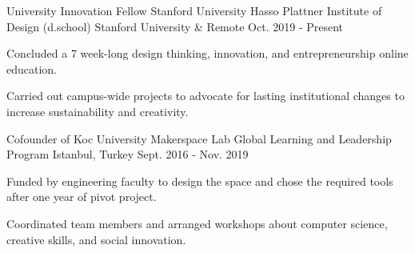 \begin{cventries}
  \cvopenentry
    {University Innovation Fellow} %
    {Stanford University Hasso Plattner Institute of Design (d.school) } %
    {Stanford University \& Remote} %
    {Oct. 2019 - Present} %
    {
    \begin{cvitems} %
        \item {Concluded a 7 week-long design thinking, innovation, and entrepreneurship online education.}
        \item {Carried out campus-wide projects to advocate for lasting institutional changes to increase sustainability and creativity.}
     \end{cvitems}
    }
  \cvopenentry
    {Cofounder of Koc University Makerspace Lab} %
    {Global Learning and Leadership Program} %
    {Istanbul, Turkey} %
    {Sept. 2016 - Nov. 2019} %
    {
      \begin{cvitems} %
        \item {Funded by engineering faculty to design the space and chose the required tools after one year of pivot project.}
        \item {Coordinated team members and arranged workshops about computer science, creative skills, and social innovation.}

\end{cvitems}}
\end{cventries}
